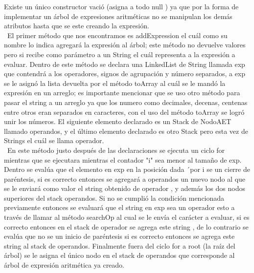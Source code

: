 \documentclass{report}
\begin{document}
Existe un único constructor vació (asigna a todo null ) ya que por la forma de implementar un árbol de expresiones aritméticas no se manipulan los demás atributos hasta que se este creando la expresión.\\\
 El primer método que nos encontramos es addExpression el cuál como su nombre lo indica agregará la expresión al árbol; este método no devuelve valores pero si recibe como parámetro a un String el cuál representa a la expresión a evaluar. Dentro de este método se declara una LinkedList de String  llamada exp que contendrá a los operadores, signos de agrupación y número separados, a exp se le asignó la lista devuelta por el método toArray  al cuál se le mandó la expresión en un arreglo; es importante mencionar que se uso otro método para pasar el string a un arreglo ya que los numero como decimales, decenas, centenas entre otros eran separados en caracteres, con el uso del método toArray se logró unir los números. El siguiente  elemento declarado es un Stack de NodoAET llamado operandos, y el último elemento declarado es otro Stack pero esta vez de Strings el cuál se llama operador.\\\
 En este método justo después de las declaraciones se ejecuta un ciclo for mientras que se ejecutara mientras el contador "i" sea menor al tamaño de exp. Dentro se evalúa que el elemento en exp en la posición dada ´por i se un cierre de paréntesis, si es correcto entonces se agregará a operandos un nuevo nodo al que se  le enviará como valor el string obtenido de operador ,  y además los dos nodos superiores del stack operandos. Si no se cumplió la condición mencionada previamente entonces se evaluará que el string en exp sea un operador esto a través de llamar al método searchOp al cual se le envía el carácter a evaluar, si es correcto entonces  en el stack de operador se agrega este string , de lo contrario se evalúa que no se un inicio de paréntesis si es correcto entonces se agrega este string al stack de operandos. Finalmente fuera del ciclo for a root (la raíz del árbol) se le asigna el único nodo en el stack de operandos que corresponde al árbol de expresión aritmética ya creado.\\\
\end{document}
